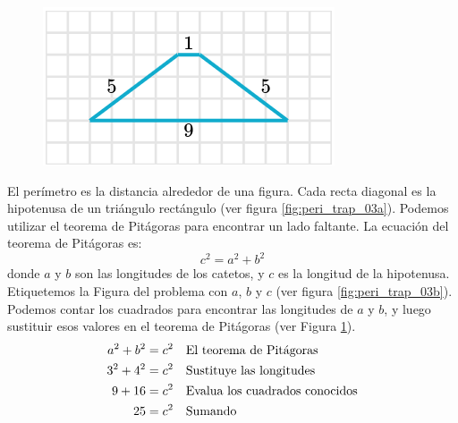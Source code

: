 \begin{solutionbox}{9.5cm}
\begin{minipage}{0.4\textwidth}
\begin{multicols}{2}
\begin{figure}[H]
                \caption{}
                \label{fig:peri_trap_03c}
            \end{figure}
            \begin{figure}[H]
                \centering
                \includegraphics[width=\linewidth]{../images/peri_trap_03d.png}
                \caption{}
                \label{fig:peri_trap_03d}
            \end{figure}
        \end{multicols}
    \end{minipage}\hfill
    \begin{minipage}{0.55\textwidth}
        El perímetro es la distancia alrededor de una figura.
        Cada recta diagonal es la hipotenusa de un triángulo rectángulo (ver figura \ref{fig:peri_trap_03a}).
        Podemos utilizar el teorema de Pitágoras para encontrar un lado faltante.
        La ecuación del teorema de Pitágoras es:
        \[c^2=a^2+b^2\]
        donde $a$ y $b$ son las longitudes de los catetos, y $c$ es la longitud de la hipotenusa.
        Etiquetemos la Figura del problema con $a$, $b$ y $c$ (ver figura \ref{fig:peri_trap_03b}).
        Podemos contar los cuadrados para encontrar las longitudes de $a$ y $b$, y luego sustituir esos valores en el teorema de Pitágoras (ver Figura \ref{fig:peri_trap_03c}).
        \begin{align*}
            a^2+b^2  =c^2 & \text{\quad El teorema de Pitágoras}                          \\
            3^2+4^2  =c^2 & \text{\quad Sustituye las longitudes}                         \\
            9 +16 =c^2    & \text{\quad Evalua los cuadrados conocidos}                   \\
            25=c^2        & \text{\quad Sumando }                                         \\

\end{align*}
\end{minipage}
\end{solutionbox}
